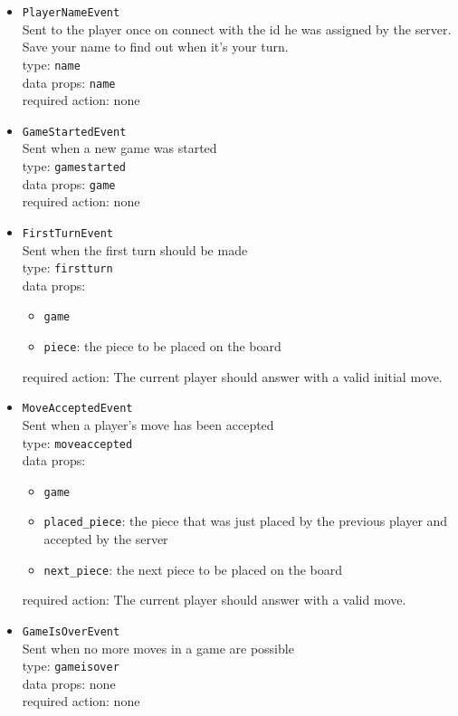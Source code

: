 \documentclass{scrartcl}
\begin{document}
\begin{itemize}
\item \texttt{PlayerNameEvent} \\
  Sent to the player once on connect with the id he was assigned
  by the server. Save your name to find out when it's your turn. \\
  type: \texttt{name} \\
  data props: \texttt{name} \\
  required action: none

\item \texttt{GameStartedEvent} \\
  Sent when a new game was started \\
  type: \texttt{gamestarted} \\
  data props: \texttt{game} \\
  required action: none

\item \texttt{FirstTurnEvent} \\
  Sent when the first turn should be made \\
  type: \texttt{firstturn} \\
  data props:
    \begin{itemize}
      \item \texttt{game}
      \item \texttt{piece}: the piece to be placed
        on the board
    \end{itemize}
  required action: The current player should answer
    with a valid initial move.

\item \texttt{MoveAcceptedEvent} \\
  Sent when a player's move has been accepted \\
  type: \texttt{moveaccepted} \\
  data props:
    \begin{itemize}
      \item \texttt{game}
      \item \texttt{placed\_piece}: the piece that was just
        placed by the previous player and accepted by the
        server
      \item \texttt{next\_piece}: the next piece to be placed
        on the board
    \end{itemize}
  required action: The current player should answer
    with a valid move.

\item \texttt{GameIsOverEvent} \\
  Sent when no more moves in a game are possible \\
  type: \texttt{gameisover} \\
  data props: none \\
  required action: none


\end{itemize}
\end{document}
